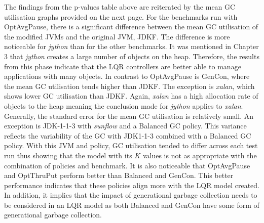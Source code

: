 The findings from the p-values table above are reiterated by the mean GC
utilisation graphs provided on the next page. For the benchmarks run
with OptAvgPause, there is a significant difference between the mean GC
utilisation of the modified JVMs and the original JVM, JDKF. The
difference is more noticeable for \emph{jython} than for the other benchmarks.
It was mentioned in Chapter 3 that \emph{jython} creates a large number of
objects on the heap. Therefore, the results from this phase indicate
that the LQR controllers are better able to manage applications with
many objects.
\newline\newline
In contrast to OptAvgPause is GenCon, where the mean GC utilisation
tends higher than JDKF. The exception is \emph{xalan}, which shows lower GC
utilisation than JDKF. Again, \emph{xalan} has a high allocation rate of
objects to the heap meaning the conclusion made for \emph{jython} applies to \emph{xalan}. 
\newline\newline
Generally, the standard error for the mean GC utilisation is relatively small. An exception is JDK-1-1-3 with \emph{sunflow} and a Balanced GC policy. This variance reflects the variability of the GC with JDK1-1-3 combined with a Balanced GC policy. With this JVM and policy, GC utilisation tended to differ across each test run thus showing that the model with its  \begin{math} K\end{math} values is not as appropriate with the combination of policies and benchmark. 
\newline\newline
It is also noticeable that OptAvgPause and OptThruPut perform better than Balanced and GenCon. This better performance indicates that these policies align more with the LQR model created. In addition, it implies that the impact of generational garbage collection needs to be considered in an LQR model as both Balanced and GenCon have some form of generational garbage collection. 

